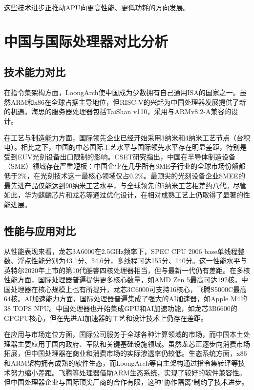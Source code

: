 \documentclass[a4paper,colorlinks=true,linkcolor=blue,urlcolor=blue,citecolor=green,bookmarks=true]{article}
\begin{document}
这些技术进步正推动APU向更高性能、更低功耗的方向发展\cite{14}\cite{15}。

\section{中国与国际处理器对比分析}

\subsection{技术能力对比}

在指令集架构方面，LoongArch使中国成为少数拥有自己通用ISA的国家之一\cite{9}。虽然ARM和x86在全球占据主导地位，但RISC-V的兴起为中国处理器发展提供了新的机遇\cite{19}。海思的服务器处理器包括TaiShan v110，采用与ARMv8.2-A兼容的设计\cite{13}。

在工艺与制造能力方面，国际领先企业已经开始采用3纳米和4纳米工艺节点（台积电）\cite{15}。相比之下，中国的中芯国际工艺水平与国际领先水平存在明显差距，特别是受到EUV光刻设备出口限制的影响\cite{17}\cite{1}\cite{3}。CSET研究指出，中国在半导体制造设备（SME）领域存在严重短板\cite{4}：中国企业在几乎所有SME子行业的全球市场份额都低于2\%，在光刻技术这一最核心领域仅占0.2\%。最顶尖的光刻设备企业SMEE的最先进产品仅能达到90纳米工艺水平，与全球领先的5纳米工艺相差约八代。尽管如此，华为麒麟芯片和龙芯等通过优化设计，在相对成熟工艺上仍取得了显著的性能进展\cite{6}。

\subsection{性能与应用对比}

从性能表现来看，龙芯3A6000在2.5GHz频率下，SPEC CPU 2006 base单线程整数、浮点性能分别为43.1分、54.6分，多线程可达155分、140分\cite{6}。这一性能水平与英特尔2020年上市的第10代酷睿四核处理器相当，但与最新一代仍有差距\cite{6}。在多核性能方面，国际处理器普遍提供更多核心数量，如AMD Zen 5最高可达192核\cite{14}。中国处理器在核心规模上也有所提升，龙芯3C6000可支持16核心，飞腾S5000C最高64核\cite{7}。AI加速能力方面，国际处理器普遍集成了强大的AI加速器，如Apple M4的38 TOPS NPU\cite{15}。中国处理器也开始集成GPU和AI加速功能，如龙芯3B6600的GPGPU核心\cite{6}，但在先进AI加速器的工艺和设计技术上仍存在差距。

在应用与市场定位方面，国际公司服务于全球各种计算领域的市场，而中国本土处理器主要应用于国内政府、军队和关键基础设施领域。虽然龙芯正逐步向消费市场拓展，但中国处理器在商业和消费市场的实际渗透率仍较低\cite{4}。生态系统方面，x86和ARM架构拥有成熟的软件生态，而LoongArch等自主架构通过指令集转译等技术努力缩小差距。飞腾等处理器借助ARM生态系统，实现了较好的软件兼容性。但中国处理器企业与国际顶尖厂商的合作有限，这种"协作隔离"制约了技术进步\cite{4}。
\end{document}
